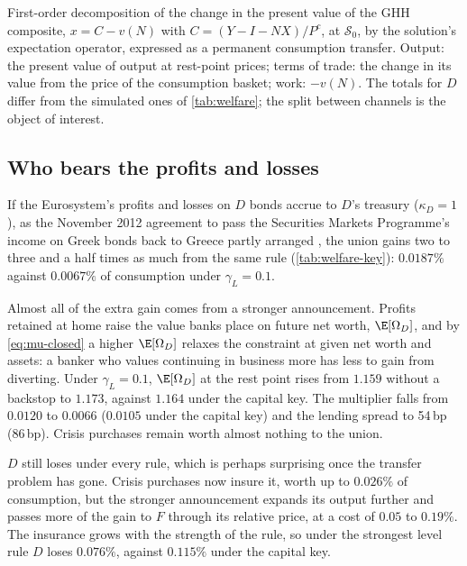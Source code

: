 \begin{table}[tbp]
\begin{threeparttable}
\begin{tabular}{l rrrrr r}
    \bottomrule
  \end{tabular}
  \begin{tablenotes}\footnotesize
  \item First-order decomposition of the change in the present value of the GHH composite,
  $x=C-v(N)$ with $C=(Y-I-NX)/P^{c}$, at $\mathcal S_0$, by the solution's expectation operator,
  expressed as a permanent consumption transfer. Output: the present value of output at
  rest-point prices; terms of trade: the change in its value from the price of the consumption
  basket; work: $-v(N)$. The totals for $D$ differ from the simulated ones of \cref{tab:welfare};
  the split between channels is the object of interest.
  \end{tablenotes}
  \end{threeparttable}
\end{table}

\subsection{Who bears the profits and losses}
\label{sec:welfare-key}

If the Eurosystem's profits and losses on $D$ bonds accrue to $D$'s treasury ($\kappa_D=1$), as the
November 2012 agreement to pass the Securities Markets Programme's income on Greek bonds back to
Greece partly arranged \citep{eurogroup2012}, the union gains two to three and a half times as much
from the same rule (\cref{tab:welfare-key}): $0.0187\%$ against $0.0067\%$ of consumption under
$\gamma_L=0.1$.

Almost all of the extra gain comes from a stronger announcement. Profits retained at home raise the
value banks place on future net worth, $\E[\Omega_D]$, and by \eqref{eq:mu-closed} a higher
$\E[\Omega_D]$ relaxes the constraint at given net worth and assets: a banker who values continuing
in business more has less to gain from diverting. Under $\gamma_L=0.1$, $\E[\Omega_D]$ at the rest
point rises from $1.159$ without a backstop to $1.173$, against $1.164$ under the capital key. The
multiplier falls from $0.0120$ to $0.0066$ ($0.0105$ under the capital key) and the lending spread to
54\,bp (86\,bp). Crisis purchases remain worth almost nothing to the union.

$D$ still loses under every rule, which is perhaps surprising once the transfer problem has gone.
Crisis purchases now insure it, worth up to $0.026\%$ of consumption, but the stronger announcement
expands its output further and passes more of the gain to $F$ through its relative price, at a cost
of $0.05$ to $0.19\%$. The insurance grows with the strength of the rule, so under the strongest level
rule $D$ loses $0.076\%$, against $0.115\%$ under the capital key.

